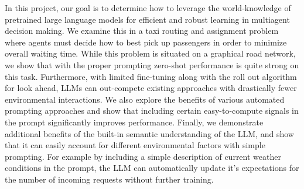 In this project, our goal is to determine how to leverage the world-knowledge of pretrained large language models for efficient and robust learning in multiagent decision making.  We examine this in a taxi routing and assignment problem where agents must decide how to best pick up passengers in order to minimize overall waiting time.  While this problem is situated on a graphical road network, we show that with the proper prompting zero-shot performance is quite strong on this task. Furthermore, with limited fine-tuning along with the roll out algorithm for look ahead, LLMs can out-compete existing approaches with drastically fewer environmental interactions.  We also explore the benefits of various automated prompting approaches and show that including certain easy-to-compute signals in the prompt significantly improves performance.  Finally, we demonstrate additional benefits of the built-in semantic understanding of the LLM, and show that it can easily account for different environmental factors with simple prompting.  For example by including a simple description of current weather conditions in the prompt, the LLM can automatically update it's expectations for the number of incoming requests without further training.